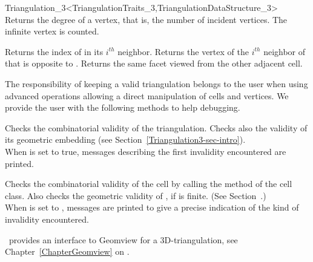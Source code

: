 \begin{ccRefClass}{Triangulation_3<TriangulationTraits_3,TriangulationDataStructure_3>}
{Returns the degree of a vertex, that is, the number of incident vertices.
The infinite vertex is counted.
}


{Returns the index of  in its $i^{th}$ neighbor.
}
\ccGlue
{}
{Returns the vertex of the $i^{th}$ neighbor of  that is opposite to
.
}
\ccGlue
{}
{Returns the same facet viewed from the other adjacent cell.}

\begin{ccAdvanced}
The responsibility of keeping a valid triangulation belongs to the user
when using advanced operations allowing a direct manipulation of cells
and vertices. We provide the user with the following methods to help
debugging. 

{Checks the combinatorial validity of the triangulation. Checks also the
validity of its geometric embedding (see
Section~\ref{Triangulation3-sec-intro}).\\ When  is set to true, 
messages describing the first invalidity encountered are printed.}

{Checks the combinatorial validity of the cell by calling the
 method of the  cell class. Also checks the
geometric validity of , if  is finite. (See
Section~\pageref{Triangulation3-sec-intro}.)\\ 
When  is set to , messages are printed to give
a precise indication of the kind of invalidity encountered.}

\end{ccAdvanced}


\cgal\ provides an interface to Geomview for a 3D-triangulation,
see Chapter~\ref{ChapterGeomview} on .


\end{ccRefClass}
